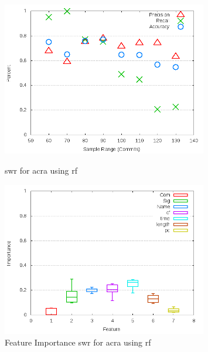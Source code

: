\begin{figure}
\centering
\includegraphics[width=0.8\textwidth]{images/rf/test_1/acra_sample_range.png}
\caption{\gls{swr} for acra using \gls{rf}}
\label{fig:test_1_acra_rf}
\includegraphics[width=0.8\textwidth]{images/rf/test_1/acra_importance.png}
\caption{Feature Importance \gls{swr} for acra using \gls{rf}}
\label{fig:test_1_acra_rf_importance}
\end{figure}



